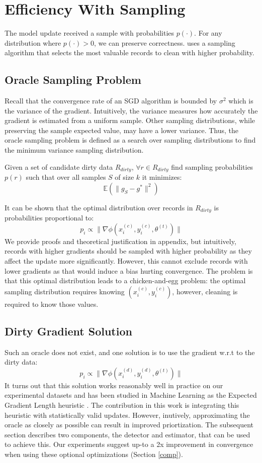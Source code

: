 \section{Efficiency With Sampling}\label{dist-samp}
The model update received a sample with probabilities $p(\cdot)$.
For any distribution where  $p(\cdot) > 0$, we can preserve correctness.
\sys uses a sampling algorithm that selects the most valuable records to clean with higher probability. 

\subsection{Oracle Sampling Problem}
Recall that the convergence rate of an SGD algorithm is bounded by $\sigma^2$ which is the variance of the gradient.
Intuitively, the variance measures how accurately the gradient is estimated from a uniform sample.
Other sampling distributions, while preserving the sample expected value, may have a lower variance.
Thus, the oracle sampling problem is defined as a search over sampling distributions to find the minimum variance sampling distribution.

\begin{definition}
Given a set of candidate dirty data $R_{dirty}$, $\forall r \in R_{dirty}$ find sampling probabilities $p(r)$ such that over all samples $S$ of size $k$ it minimizes:
\[
\mathbb{E}(\|g_S - g^*\|^2)
\]
\end{definition}
It can be shown that the optimal distribution over records in $R_{dirty}$ is probabilities proportional to:
\[
p_i \propto \|\nabla\phi(x^{(c)}_i,y^{(c)}_i,\theta^{(t)})\|
\]
We provide proofs and theoretical justification in appendix, but intuitively, records with higher gradients should be sampled with higher probability as they affect the update more significantly.
However, this cannot exclude records with lower gradients as that would induce a bias hurting convergence.
The problem is that this optimal distribution leads to a chicken-and-egg problem:
the optimal sampling distribution requires knowing $(x^{(c)}_i,y^{(c)}_i)$, however, cleaning is required to know those values.

\subsection{Dirty Gradient Solution}
Such an oracle does not exist, and one solution is to use the gradient w.r.t to the dirty data:
\[
p_i \propto \|\nabla\phi(x^{(d)}_i,y^{(d)}_i,\theta^{(t)})\|
\]
It turns out that this solution works reasonably well in practice on our experimental datasets and has been studied in Machine Learning as the Expected Gradient Length heuristic \cite{settles2010active}.
The contribution in this work is integrating this heuristic with statistically valid updates.
However, inutively, approximating the oracle as closely as possible can result in improved priortization.
The subsequent section describes two components, the detector and estimator, that can be used to achieve this.
Our experiments suggest up-to a 2x improvement in convergence when using these optional optimizations (Section \ref{comp}).